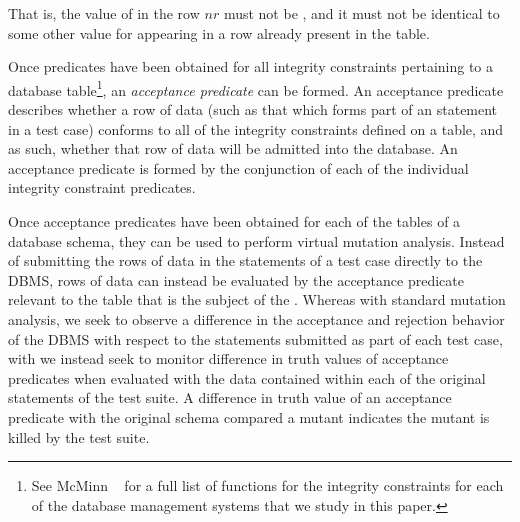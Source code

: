 \vspace{-.6em}
\begin{center}
\end{center}
\vspace{-.6em}

\noindent That is, the value of  in the row $nr$ must not
be \NULL, and it must not be identical to some other value for  appearing in a row already present in the table.

% 



Once predicates have been obtained for all integrity constraints pertaining to a database table\footnote{{\scriptsize See McMinn \etal~\cite{McMinn2015} for a full list of functions for the integrity constraints for each of the database management systems that we study in this paper.}}, an {\it acceptance predicate} can be formed. An acceptance predicate describes whether a row of data (such as that which forms part of an \INSERT statement in a test case) conforms to all of the integrity constraints defined on a table, and as such, whether that row of data will be admitted into the database. An acceptance predicate is formed by the conjunction of each of the individual integrity constraint predicates.


 Once acceptance predicates have been obtained for each of the tables of a database schema, they can be used to perform virtual mutation analysis. Instead of submitting the rows of data in the \INSERT statements of a test case directly to the DBMS, rows of data can instead be evaluated by the acceptance predicate relevant to the table that is the subject of the \INSERT. Whereas with standard mutation analysis, we seek to observe a difference in the acceptance and rejection behavior of the DBMS with respect to the \INSERT statements submitted as part of each test case, with \vma we instead seek to monitor difference in truth values of acceptance predicates when evaluated with the data contained within each of the original \INSERT statements of the test suite. A difference in truth value of an acceptance predicate with the original schema compared a mutant indicates the mutant is killed by the test suite.

